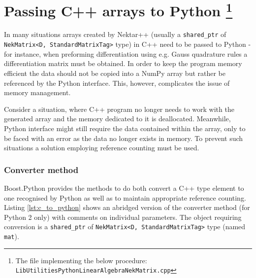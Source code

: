 \section{Passing C++ arrays to Python \footnote{The file implementing the below procedure: \texttt{LibUtilities\/Python\/LinearAlgebra\/NekMatrix.cpp}} }

In many situations arrays created by Nektar++ (usually a \texttt{shared\_ptr} of 
\texttt{NekMatrix<D, StandardMatrixTag>} type) in C++ need to be passed to Python - 
for instance, when preforming differentiation using e.g. Gauss quadrature rules a 
differentiation matrix must be obtained. In order to keep the program memory efficient 
the data should not be copied into a NumPy array but rather be referenced by the Python 
interface. This, however, complicates the issue of memory management.

Consider a situation, where C++ program no longer needs to work with the generated array 
and the memory dedicated to it is deallocated. Meanwhile, Python interface might still require 
the data contained within the array, only to be faced with an error as the data no longer 
exists in memory. To prevent such situations a solution employing reference counting must be used.

\subsubsection{Converter method}

Boost.Python provides the methods to do both convert a C++ type element to one recognised by 
Python as well as to maintain appropriate reference counting. Listing \ref{lst:c_to_python} 
shows an abridged version of the converter method (for Python 2 only) with comments on 
individual parameters. The object requiring conversion is a \texttt{shared\_ptr} of 
\texttt{NekMatrix<D, StandardMatrixTag>} type (named \texttt{mat}).

